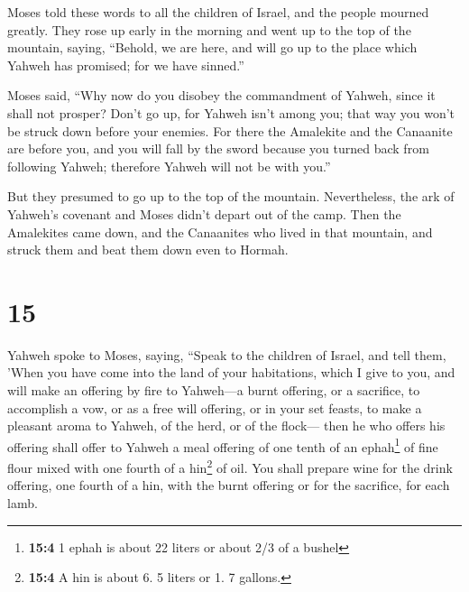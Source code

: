  Moses told these words to all the children of Israel,
and the people mourned greatly.  They rose up early in
the morning and went up to the top of the mountain, saying, ``Behold, we
are here, and will go up to the place which Yahweh has promised; for we
have sinned.''

 Moses said, ``Why now do you disobey the commandment of
Yahweh, since it shall not prosper?  Don't go up, for
Yahweh isn't among you; that way you won't be struck down before your
enemies.  For there the Amalekite and the Canaanite are
before you, and you will fall by the sword because you turned back from
following Yahweh; therefore Yahweh will not be with you.''

 But they presumed to go up to the top of the mountain.
Nevertheless, the ark of Yahweh's covenant and Moses didn't depart out
of the camp.  Then the Amalekites came down, and the
Canaanites who lived in that mountain, and struck them and beat them
down even to Hormah.

\hypertarget{section-14}{%
\section{15}\label{section-14}}

 Yahweh spoke to Moses, saying,  ``Speak to
the children of Israel, and tell them, 'When you have come into the land
of your habitations, which I give to you,  and will make
an offering by fire to Yahweh---a burnt offering, or a sacrifice, to
accomplish a vow, or as a free will offering, or in your set feasts, to
make a pleasant aroma to Yahweh, of the herd, or of the flock---
 then he who offers his offering shall offer to Yahweh a
meal offering of one tenth of an ephah\footnote{\textbf{15:4} 1 ephah is
  about 22 liters or about 2/3 of a bushel} of fine flour mixed with one
fourth of a hin\footnote{\textbf{15:4} A hin is about 6. 5 liters or 1.
  7 gallons.} of oil.  You shall prepare wine for the
drink offering, one fourth of a hin, with the burnt offering or for the
sacrifice, for each lamb.

